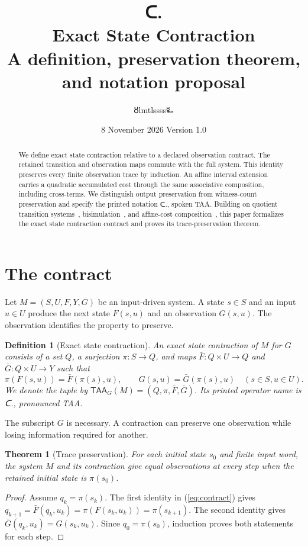 \documentclass[11pt,a4paper]{article}
\title{{\taafont ᑕ.}\\Exact State Contraction\\\large A definition, preservation theorem, and notation proposal}
\author{🜘lmtlssss🜐}
\date{8 November 2026 \quad Version 1.0}
\newtheorem{definition}{Definition}
\newtheorem{theorem}{Theorem}
\newcommand{\TAA}{\mathsf{TAA}}
\begin{document}
\maketitle
\begin{abstract}
We define exact state contraction relative to a declared observation contract.
The retained transition and observation maps commute with the full system.
This identity preserves every finite observation trace by induction.
An affine interval extension carries a quadratic accumulated cost through the
same associative composition, including cross-terms. We distinguish output
preservation from witness-count preservation and specify the printed notation
{\taafont ᑕ.}, spoken TAA. Building on quotient transition systems~\cite{moore1956,nerode1958}, bisimulation~\cite{park1981,milner1989}, and affine-cost composition~\cite{affine}, this paper formalizes the exact state contraction contract and proves its trace-preservation theorem.
\end{abstract}

\section{The contract}
Let $M=(S,U,F,Y,G)$ be an input-driven system. A state $s\in S$ and an
input $u\in U$ produce the next state $F(s,u)$ and an observation $G(s,u)$.
The observation identifies the property to preserve.
\begin{definition}[Exact state contraction]
An exact state contraction of $M$ for $G$ consists of a set $Q$, a
surjection $\pi:S\rightarrow Q$, and maps
$\bar F:Q\times U\rightarrow Q$ and $\bar G:Q\times U\rightarrow Y$ such that
\begin{equation}\label{eq:contract}
 \pi(F(s,u))=\bar F(\pi(s),u),\qquad
 G(s,u)=\bar G(\pi(s),u)
 \quad (s\in S,u\in U).
\end{equation}
We denote the tuple by $\TAA_G(M)=(Q,\pi,\bar F,\bar G)$.
Its printed operator name is {\taafont ᑕ.}, pronounced TAA.
\end{definition}

The subscript $G$ is necessary. A contraction can preserve one observation
while losing information required for another.

\begin{theorem}[Trace preservation]
For each initial state $s_0$ and finite input word, the system $M$ and
its contraction give equal observations at every step when the retained
initial state is $\pi(s_0)$.
\end{theorem}
\begin{proof}
Assume $q_k=\pi(s_k)$. The first identity in (\ref{eq:contract}) gives
$q_{k+1}=\bar F(q_k,u_k)=\pi(F(s_k,u_k))=\pi(s_{k+1})$.
The second identity gives
$\bar G(q_k,u_k)=G(s_k,u_k)$.
Since $q_0=\pi(s_0)$, induction proves both statements for each step.
\end{proof}
\end{document}
